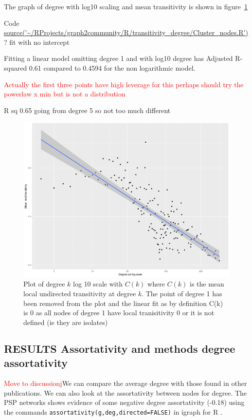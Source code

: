 The graph of degree with log10 scaling and mean transitivity is shown in figure~\ref{fig:C(k)_remove0}

Code \url{source('~/RProjects/graph2community/R/transitivity_degree/Cluster_nodes.R')}
? fit with no intercept

Fitting a linear model omitting degree 1 and with log10 degree has Adjusted R-squared 0.61 compared to 0.4594 for the non logarithmic model.

\textcolor{red}{Actually the first three points have high leverage for this perhaps should try the powerlaw x min but is not a distribution}

R sq 0.65 going from degree 5 so not too much different

\begin{figure}
    \centering
    \includegraphics[width=\textwidth]{images/Rplot_k(c)_remove0.png}
    \caption{Plot of degree $k$ log 10 scale with $C(k)$ where $C(k)$ is the mean local undirected transitivity at degree $k$. The point of degree 1 has been removed from the plot and the linear fit as by definition C(k) is 0 as all nodes of degree 1 have local tranisitivity 0 or it is not defined (ie they are isolates)}
    \label{fig:C(k)_remove0}
\end{figure}

\subsection{RESULTS Assortativity and methods degree assortativity}
\textcolor{red}{Move to discussionj}We can compare the average degree with those found in other publications. We can also look at the assortativity between nodes for degree. The PSP networks shows evidence of some negative degree assortativity (-0.18) using the commands \texttt{assortativity(g,deg,directed=FALSE)} in igraph for R .

